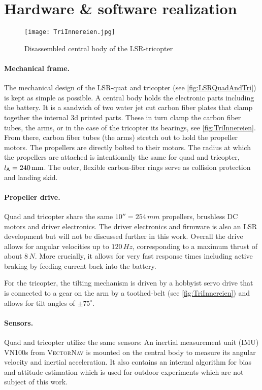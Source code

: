 \section{Hardware \& software realization}

\begin{figure}
 \centering
 \texttt{[image: TriInnereien.jpg]}
 \caption{Disassembled central body of the LSR-tricopter}
 \label{fig:TriInnereien}
\end{figure}

\paragraph{Mechanical frame.}
The mechanical design of the LSR-quat and tricopter (see \autoref{fig:LSRQuadAndTri}) is kept as simple as possible.
A central body holds the electronic parts including the battery.
It is a sandwich of two water jet cut carbon fiber plates that clamp together the internal 3d printed parts. 
These in turn clamp the carbon fiber tubes, the arms, or in the case of the tricopter its bearings, see \autoref{fig:TriInnereien}.
From there, carbon fiber tubes (the arms) stretch out to hold the propeller motors.
The propellers are directly bolted to their motors.
The radius at which the propellers are attached is intentionally the same for quad and tricopter, $l_{\mathsf{A}} = 240\,\text{mm}$.
The outer, flexible carbon-fiber rings serve as collision protection and landing skid.

\paragraph{Propeller drive.}
Quad and tricopter share the same $10'' = 254\,\unit{mm}$ propellers, brushless DC motors and driver electronics.
The driver electronics and firmware is also an LSR development but will not be discussed further in this work.
Overall the drive allows for angular velocities up to $120\,\unit{Hz}$, corresponding to a maximum thrust of about $8\,\unit{N}$.
More crucially, it allows for very fast response times including active braking by feeding current back into the battery.

For the tricopter, the tilting mechanism is driven by a hobbyist servo drive that is connected to a gear on the arm by a toothed-belt (see \autoref{fig:TriInnereien}) and allows for tilt angles of $\pm 75^\circ$.

\paragraph{Sensors.}
Quad and tricopter utilize the same sensors:
An inertial measurement unit (IMU) VN100s from \textsc{VectorNav} is mounted on the central body to measure its angular velocity and inertial acceleration.
It also contains an internal algorithm for bias and attitude estimation which is used for outdoor experiments which are not subject of this work.


